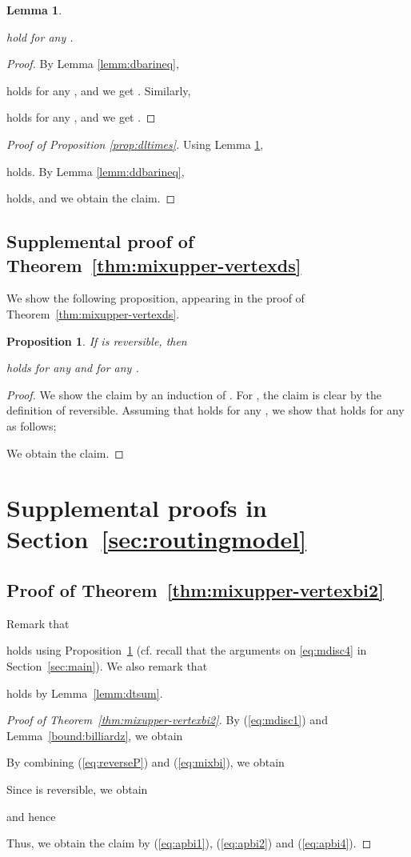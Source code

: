 \documentclass[letter, 11pt]{article}
\newcommand{\1}{\mbox{1}\hspace{-0.25em}\mbox{l}}
\newtheorem{lemma}[theorem]{Lemma}
\newtheorem{proposition}[theorem]{Proposition}
\begin{document}
\begin{lemma}
\label{lemm:smp}

hold for any . 
\end{lemma} 
\begin{proof}
By Lemma \ref{lemm:dbarineq}, 

holds for any , and we get . 
Similarly, 

holds for any , and we get . 
\end{proof}

\begin{proof}[Proof of Proposition \ref{prop:dltimes}]
Using Lemma \ref{lemm:smp}, 

holds. 
By Lemma \ref{lemm:ddbarineq}, 

holds, and we obtain the claim. 
\end{proof}

\subsection{Supplemental proof of Theorem~\ref{thm:mixupper-vertexds}}
We show the following proposition, appearing in the proof of Theorem~\ref{thm:mixupper-vertexds}.  
\begin{proposition}
\label{prop:reversible}
If  is reversible, then 

holds for any  and for any . 
\end{proposition}
\begin{proof}
 We show the claim by an induction of . 
 For , the claim is clear by the definition of reversible. 
 Assuming that  holds for any , 
 we show that  holds for any  as follows;  

We obtain the claim.
\end{proof}

\section{Supplemental proofs in Section~\ref{sec:routingmodel}}
\subsection{Proof of Theorem~\ref{thm:mixupper-vertexbi2}}\label{appendix:billiard}
Remark that

holds using Proposition~\ref{prop:reversible} (cf. recall that the arguments on \eqref{eq:mdisc4} in Section~\ref{sec:main}). 
We also remark that

holds by Lemma~\ref{lemm:dtsum}. 
\begin{proof}[Proof of Theorem~\ref{thm:mixupper-vertexbi2}]
By (\ref{eq:mdisc1}) and Lemma~\ref{bound:billiardz}, we obtain 

By combining (\ref{eq:reverseP}) and (\ref{eq:mixbi}), we obtain

Since  is reversible, we obtain 

and hence

Thus, we obtain the claim by (\ref{eq:apbi1}), (\ref{eq:apbi2}) and (\ref{eq:apbi4}). 
\end{proof}
\end{document}

